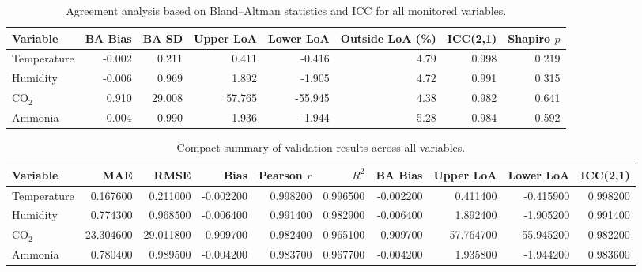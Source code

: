 \begin{table}[h]
\centering
\caption{Agreement analysis based on Bland--Altman statistics and ICC for all monitored variables.}
\label{tab:agreement_metrics}
\begin{tabular}{lrrrrrrr}
\hline
Variable & BA Bias & BA SD & Upper LoA & Lower LoA & Outside LoA (\%) & ICC(2,1) & Shapiro $p$ \\
\hline
Temperature & -0.002 & 0.211 & 0.411 & -0.416 & 4.79 & 0.998 & 0.219 \\
Humidity & -0.006 & 0.969 & 1.892 & -1.905 & 4.72 & 0.991 & 0.315 \\
CO$_2$ & 0.910 & 29.008 & 57.765 & -55.945 & 4.38 & 0.982 & 0.641 \\
Ammonia & -0.004 & 0.990 & 1.936 & -1.944 & 5.28 & 0.984 & 0.592 \\
\hline
\end{tabular}
\end{table}


\begin{table}
\caption{Compact summary of validation results across all variables.}
\label{tab:validation_summary}
\begin{tabular}{lrrrrrrrrr}
\toprule
Variable & MAE & RMSE & Bias & Pearson $r$ & $R^2$ & BA Bias & Upper LoA & Lower LoA & ICC(2,1) \\
\midrule
Temperature & 0.167600 & 0.211000 & -0.002200 & 0.998200 & 0.996500 & -0.002200 & 0.411400 & -0.415900 & 0.998200 \\
Humidity & 0.774300 & 0.968500 & -0.006400 & 0.991400 & 0.982900 & -0.006400 & 1.892400 & -1.905200 & 0.991400 \\
CO$_2$ & 23.304600 & 29.011800 & 0.909700 & 0.982400 & 0.965100 & 0.909700 & 57.764700 & -55.945200 & 0.982200 \\
Ammonia & 0.780400 & 0.989500 & -0.004200 & 0.983700 & 0.967700 & -0.004200 & 1.935800 & -1.944200 & 0.983600 \\
\bottomrule
\end{tabular}
\end{table}
